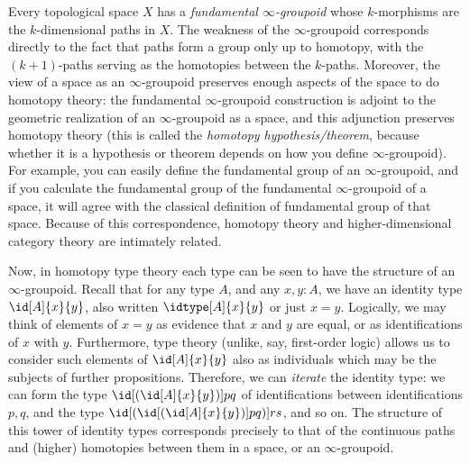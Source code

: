 Every topological space $X$ has a \emph{fundamental $\infty$-groupoid}
whose
$k$-mor\-ph\-isms are the $k$-dimen\-sional paths in $X$.  The weakness of the
$\infty$-group\-oid corresponds directly to the fact that paths form a
group only up to homotopy, with the $(k+1)$-paths serving as the
homotopies between the $k$-paths.  Moreover, the view of a space as an
$\infty$-groupoid preserves enough aspects of the space to do homotopy theory:
the fundamental $\infty$-groupoid construction is adjoint to the
geometric realization of an $\infty$-groupoid as a space, and this
adjunction preserves homotopy theory (this is called the \emph{homotopy
  hypothesis/theorem},
because whether it is a hypothesis or theorem
depends on how you define $\infty$-groupoid).  For example, you can
easily define the fundamental group of an $\infty$-groupoid, and if you
calculate the fundamental group of the fundamental $\infty$-groupoid of
a space, it will agree with the classical definition of fundamental
group of that space.  Because of this correspondence, homotopy theory
and higher-dimensional category theory are intimately related.

%
%

\mentalpause

Now, in homotopy type theory each type can be seen to have the structure
of an $\infty$-groupoid.  Recall that for any type $A$, and any $x,y:A$,
we have an identity type $\id[A]{x}{y}$, also written $\idtype[A]{x}{y}$
or just $x=y$.  Logically, we may think of elements of $x=y$ as evidence
that $x$ and $y$ are equal, or as identifications of $x$ with
$y$. Furthermore, type theory (unlike, say, first-order logic) allows us
to consider such elements of $\id[A]{x}{y}$ also as individuals which
may be the subjects of further propositions.  Therefore, we can
\emph{iterate} the identity type: we can form the type
$\id[{(\id[A]{x}{y})}]{p}{q}$ of identifications between
identifications $p,q$, and the type
$\id[{(\id[{(\id[A]{x}{y})}]{p}{q})}]{r}{s}$, and so on.  The structure
of this tower of identity types corresponds precisely to that of the
continuous paths and (higher) homotopies between them in a space, or an
$\infty$-groupoid.


